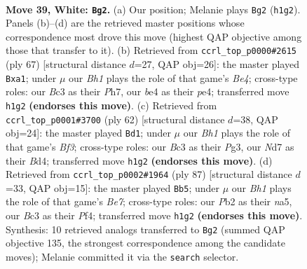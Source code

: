 \documentclass[11pt]{article}
\begin{document}
\clearpage

\begin{figure}[p]\centering
\begin{subfigure}{0.46\textwidth}\centering
\resizebox{\linewidth}{!}{%
\newchessgame
\chessboard[
  setfen={6k1/3N4/8/3p1p2/2p1bP2/1pB2n2/1P6/K6B w - - 14 39},
  showmover=false,
  pgfstyle=straightmove, color=movearrow, markmove={h1-g2}
]}
\caption{}
\end{subfigure}\hfill
\begin{subfigure}{0.46\textwidth}\centering
\resizebox{\linewidth}{!}{%
\newchessgame
\chessboard[
  setfen={7k/1p1b3p/3p4/4bN2/4P1P1/1P1B4/2P3K1/R7 b - - 0 34},
  showmover=false,
  pgfstyle=straightmove, color=movearrow, markmove={e5-a1}
]}
\caption{}
\end{subfigure}
\\[4pt]
\begin{subfigure}{0.46\textwidth}\centering
\resizebox{\linewidth}{!}{%
\newchessgame
\chessboard[
  setfen={8/7p/p3k1p1/3n1p2/2bB4/P4BP1/3K1P1P/8 w - - 0 32},
  showmover=false,
  pgfstyle=straightmove, color=movearrow, markmove={f3-d1}
]}
\caption{}
\end{subfigure}\hfill
\begin{subfigure}{0.46\textwidth}\centering
\resizebox{\linewidth}{!}{%
\newchessgame
\chessboard[
  setfen={8/8/7p/N3k3/1p3pP1/1Bb2P1P/P3b1K1/8 b - - 0 44},
  showmover=false,
  pgfstyle=straightmove, color=movearrow, markmove={e2-b5}
]}
\caption{}
\end{subfigure}
\caption{\textbf{Move 39, White: \texttt{Bg2}.} (a) Our position; Melanie plays \texttt{Bg2} (\texttt{h1g2}). Panels (b)--(d) are the retrieved master positions whose correspondence most drove this move (highest QAP objective among those that transfer to it). (b) Retrieved from \texttt{ccrl\_top\_p0000\#2615} (ply 67) [structural distance $d$=27, QAP obj=26]: the master played \texttt{Bxa1}; under $\mu$ our \emph{Bh1} plays the role of that game's \emph{Be4}; cross-type roles: our \emph{B}c3 as their \emph{P}h7, our \emph{b}e4 as their \emph{p}e4; transferred move \texttt{h1g2} \textbf{(endorses this move)}. (c) Retrieved from \texttt{ccrl\_top\_p0001\#3700} (ply 62) [structural distance $d$=38, QAP obj=24]: the master played \texttt{Bd1}; under $\mu$ our \emph{Bh1} plays the role of that game's \emph{Bf3}; cross-type roles: our \emph{B}c3 as their \emph{P}g3, our \emph{N}d7 as their \emph{B}d4; transferred move \texttt{h1g2} \textbf{(endorses this move)}. (d) Retrieved from \texttt{ccrl\_top\_p0002\#1964} (ply 87) [structural distance $d$=33, QAP obj=15]: the master played \texttt{Bb5}; under $\mu$ our \emph{Bh1} plays the role of that game's \emph{Be7}; cross-type roles: our \emph{P}b2 as their \emph{n}a5, our \emph{B}c3 as their \emph{P}f4; transferred move \texttt{h1g2} \textbf{(endorses this move)}. Synthesis: 10 retrieved analogs transferred to \texttt{Bg2} (summed QAP objective 135, the strongest correspondence among the candidate moves); Melanie committed it via the \texttt{search} selector.}
\label{fig:thought-m76}
\end{figure}
\end{document}
